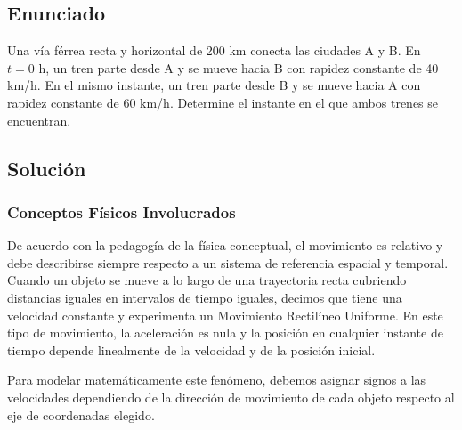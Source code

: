 \documentclass[12pt, a4paper]{article}
\begin{document}
\subsection*{Enunciado}

Una vía férrea recta y horizontal de 200 km conecta las ciudades A y B. En $t = 0 \text{ h}$, un tren parte desde A y se mueve hacia B con rapidez constante de 40 km/h. En el mismo instante, un tren parte desde B y se mueve hacia A con rapidez constante de 60 km/h. Determine el instante en el que ambos trenes se encuentran.

\vspace{0.5cm}

\begin{center}
\end{center}

\subsection*{Solución}

\subsubsection*{Conceptos Físicos Involucrados}

De acuerdo con la pedagogía de la física conceptual, el movimiento es relativo y debe describirse siempre respecto a un sistema de referencia espacial y temporal. Cuando un objeto se mueve a lo largo de una trayectoria recta cubriendo distancias iguales en intervalos de tiempo iguales, decimos que tiene una velocidad constante y experimenta un Movimiento Rectilíneo Uniforme. En este tipo de movimiento, la aceleración es nula y la posición en cualquier instante de tiempo depende linealmente de la velocidad y de la posición inicial.

Para modelar matemáticamente este fenómeno, debemos asignar signos a las velocidades dependiendo de la dirección de movimiento de cada objeto respecto al eje de coordenadas elegido.
\end{document}
